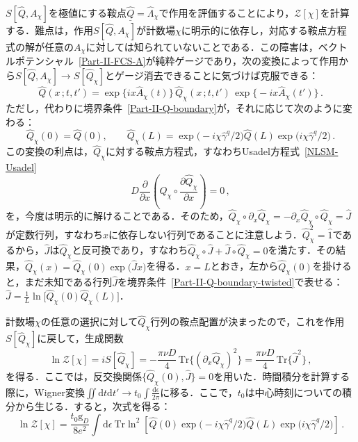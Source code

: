 \documentclass[a4paper,11pt]{ltjsarticle}
\def\Tr{\mathrm{Tr}}
\def\d{\mathrm{d}}
\begin{document}
$S[\hat Q,A_{\chi}]$を極値にする鞍点$\underline{\hat{Q}}=\hat{\Lambda}_{\chi}$で作用を評価することにより，$\mathcal{Z}[\chi]$を計算する．難点は，作用$S[\hat Q,A_{\chi}]$が計数場$\chi$に明示的に依存し，対応する鞍点方程式の解が任意の$A_{\chi}$に対しては知られていないことである．この障害は，ベクトルポテンシャル~\eqref{Part-II-FCS-A}が純粋ゲージであり，次の変換によって作用から$S[\hat
Q,A_{\chi}]\to S[\hat Q_{\chi}]$とゲージ消去できることに気づけば克服できる：
\begin{equation}
\hat{Q}(x\,;t,t')=\exp\big\{ix\hat{A}_{\chi}(t)\big\}\,
\hat{Q}_{\chi}(x\,;t,t')\,\exp\big\{-ix\hat{A}_{\chi}(t')\big\}\,.
\end{equation}
ただし，代わりに境界条件~\eqref{Part-II-Q-boundary}が，それに応じて次のように変わる：
\begin{equation}\label{Part-II-Q-boundary-twisted}
\hat{Q}_{\chi}(0)=\hat{Q}(0), \qquad
\hat{Q}_{\chi}(L)=\exp\big(-i\chi\hat{\gamma}^{q}/2\big)\hat{Q}(L)
\exp\big(i\chi\hat{\gamma}^{q}/2\big)\,.
\end{equation}
この変換の利点は，$\hat{Q}_{\chi}$に対する鞍点方程式，すなわちUsadel方程式~\eqref{NLSM-Usadel}
\begin{equation}
D\frac{\partial}{\partial
x}\left(\hat{Q}_{\chi}\circ\frac{\partial\hat{Q}_{\chi}}{\partial
x}\right)=0\,,
\end{equation}
を，今度は明示的に解けることである．そのため，$\hat{Q}_{\chi}\circ\partial_x\hat{Q}_{\chi}=-
\partial_x\hat{Q}_{\chi}\circ \hat{Q}_{\chi} =\hat{J}$が定数行列，すなわち$x$に依存しない行列であることに注意しよう．$\hat{Q}_{\chi}^2=\hat{1}$であるから，$\hat J$は$\hat{Q}_{\chi}$と反可換であり，すなわち$\hat{Q}_{\chi}\circ\hat{J}+\hat{J}\circ\hat{Q}_{\chi}=0$を満たす．その結果，$\hat{Q}_{\chi}(x)=\hat{Q}_{\chi}(0)\exp\big(\hat{J}x\big)$を得る．$x=L$とおき，左から$\hat{Q}_{\chi}(0)$を掛けると，まだ未知である行列$\hat J$を境界条件~\eqref{Part-II-Q-boundary-twisted}で表せる：$\hat{J}=\frac{1}{L}\ln\big[\hat{Q}_{\chi}(0)\hat{Q}_{\chi}(L)\big]$．



計数場$\chi$の任意の選択に対して$\hat{Q}_{\chi}$行列の鞍点配置が決まったので，これを作用$S[\hat
Q_{\chi}]$に戻して，生成関数
$$\ln\mathcal{Z}[\chi]=iS[\hat{Q}_{\chi}]=-\frac{\pi\nu D}{4}\,
\Tr\{(\partial_x\hat{Q}_{\chi})^{2}\}= \frac{\pi \nu D}{4}\,
\Tr\{\hat{J}^2\}\,,$$
を得る．ここでは，反交換関係$\{\hat{Q}_{\chi}(0),\hat{J}\}=0$を用いた．時間積分を計算する際に，Wigner変換$\iint\d t\d t'\to
t_{0}\int\frac{\d\epsilon}{2\pi}$に移る．ここで，$t_{0}$は中心時刻についての積分から生じる．すると，次式を得る：
\begin{equation}\label{Part-II-FCS-Z}
\ln\mathcal{Z}[\chi]=\frac{t_{0}\mathrm{g}_{D}}{8e^{2}}\int\d\epsilon\
\mathrm{Tr}\ln^{2}\left[\hat{Q}(0)\exp\big(-i\chi\hat{\gamma}^{q}/2\big)
\hat{Q}(L)\exp\big(i\chi\hat{\gamma}^{q}/2\big)\right]\,.
\end{equation}
\end{document}
